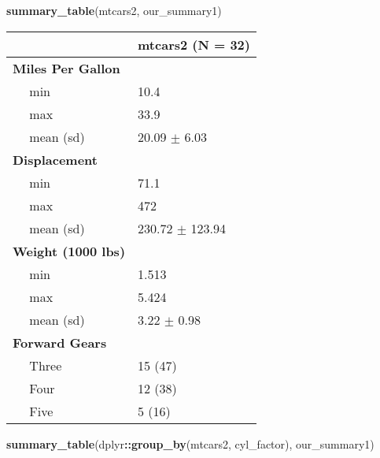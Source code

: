 \documentclass[]{article}
\newenvironment{Shaded}{\begin{snugshade}}{\end{snugshade}}
\newcommand{\KeywordTok}[1]{\textcolor[rgb]{0.13,0.29,0.53}{\textbf{#1}}}
\newcommand{\OperatorTok}[1]{\textcolor[rgb]{0.81,0.36,0.00}{\textbf{#1}}}
\newcommand{\NormalTok}[1]{#1}
\begin{document}
\begin{Shaded}
\begin{Highlighting}[]
\KeywordTok{summary_table}\NormalTok{(mtcars2, our_summary1)}
\end{Highlighting}
\end{Shaded}

\begin{tabular}{l|l}
\hline
 & mtcars2 (N = 32)\\
\hline
\bf{Miles Per Gallon} & ~\\
\hline
~~ min & 10.4\\
\hline
~~ max & 33.9\\
\hline
~~ mean (sd) & 20.09 $\pm$ 6.03\\
\hline
\bf{Displacement} & ~\\
\hline
~~ min & 71.1\\
\hline
~~ max & 472\\
\hline
~~ mean (sd) & 230.72 $\pm$ 123.94\\
\hline
\bf{Weight (1000 lbs)} & ~\\
\hline
~~ min & 1.513\\
\hline
~~ max & 5.424\\
\hline
~~ mean (sd) & 3.22 $\pm$ 0.98\\
\hline
\bf{Forward Gears} & ~\\
\hline
~~ Three & 15 (47)\\
\hline
~~ Four & 12 (38)\\
\hline
~~ Five & 5 (16)\\
\hline
\end{tabular}

\begin{Shaded}
\begin{Highlighting}[]
\KeywordTok{summary_table}\NormalTok{(dplyr}\OperatorTok{::}\KeywordTok{group_by}\NormalTok{(mtcars2, cyl_factor), our_summary1)}
\end{Highlighting}
\end{Shaded}
\end{document}
